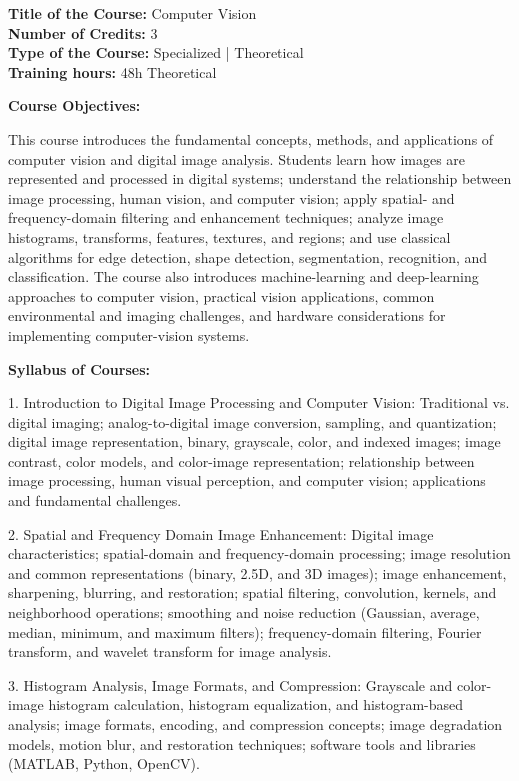 \documentclass[12pt,a4paper]{article}
\begin{document}
\newpage
\textbf{Title of the Course:} Computer Vision\\
\textbf{Number of Credits:} 3\\
\textbf{Type of the Course:} Specialized | Theoretical\\
\textbf{Training hours:} 48h Theoretical\par\vspace{4pt}
\textbf{Course Objectives:}\par\vspace{2pt}
This course introduces the fundamental concepts, methods, and applications of computer vision and digital image analysis. Students learn how images are represented and processed in digital systems; understand the relationship between image processing, human vision, and computer vision; apply spatial- and frequency-domain filtering and enhancement techniques; analyze image histograms, transforms, features, textures, and regions; and use classical algorithms for edge detection, shape detection, segmentation, recognition, and classification. The course also introduces machine-learning and deep-learning approaches to computer vision, practical vision applications, common environmental and imaging challenges, and hardware considerations for implementing computer-vision systems.\par\vspace{4pt}
\textbf{Syllabus of Courses:}\par\vspace{2pt}
1. Introduction to Digital Image Processing and Computer Vision: Traditional vs. digital imaging; analog-to-digital image conversion, sampling, and quantization; digital image representation, binary, grayscale, color, and indexed images; image contrast, color models, and color-image representation; relationship between image processing, human visual perception, and computer vision; applications and fundamental challenges.\par
2. Spatial and Frequency Domain Image Enhancement: Digital image characteristics; spatial-domain and frequency-domain processing; image resolution and common representations (binary, 2.5D, and 3D images); image enhancement, sharpening, blurring, and restoration; spatial filtering, convolution, kernels, and neighborhood operations; smoothing and noise reduction (Gaussian, average, median, minimum, and maximum filters); frequency-domain filtering, Fourier transform, and wavelet transform for image analysis.\par
3. Histogram Analysis, Image Formats, and Compression: Grayscale and color-image histogram calculation, histogram equalization, and histogram-based analysis; image formats, encoding, and compression concepts; image degradation models, motion blur, and restoration techniques; software tools and libraries (MATLAB, Python, OpenCV).\par
\end{document}

